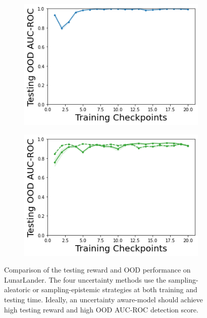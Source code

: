 \begin{figure}
\begin{subfigure}{.2\textwidth}
        \includegraphics[width=\textwidth]{sections/011_icml2022/resources/DKL-LunarLanderOOD-v0-AUC-ROC-epistemic_-testing-strategy.png}
    \end{subfigure}
    \begin{subfigure}{.2\textwidth}
        \includegraphics[width=\textwidth]{sections/011_icml2022/resources/PostNet-LunarLanderOOD-v0-AUC-ROC-epistemic_-testing-strategy.png}
    \end{subfigure}
        \vspace{-3mm}
    \caption{Comparison of the testing reward and OOD performance on LunarLander. The four uncertainty methods use the sampling-aleatoric or sampling-epistemic strategies at both training and testing time. Ideally, an uncertainty aware-model should achieve high testing reward and high OOD AUC-ROC detection score.}
    \label{fig:strategy-testing-performance-lunarlander}
        \vspace{-6mm}
\end{figure}
